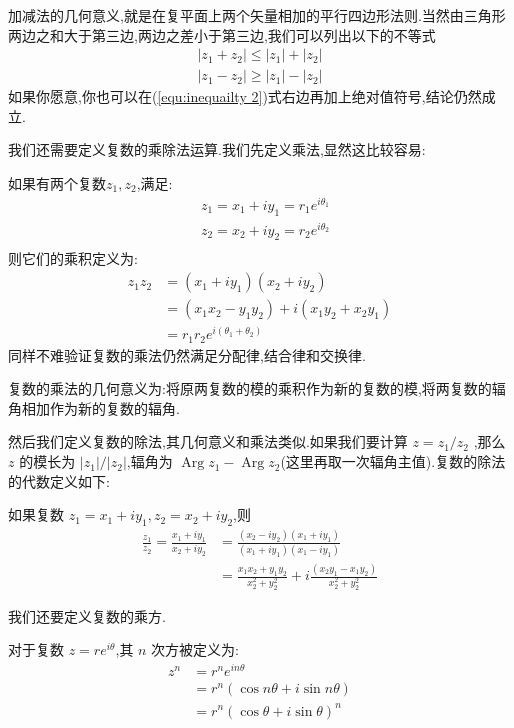\documentclass[UTF8]{ctexbook}
\begin{document}
加减法的几何意义,就是在复平面上两个矢量相加的平行四边形法则.当然由三角形两边之和大于第三边,两边之差小于第三边,我们可以列出以下的不等式
\begin{align}
    |z_1+z_2| \leqslant |z_1| + |z_2| \label{equ:inequality 1}\\
    |z_1-z_2| \geqslant |z_1| - |z_2| \label{equ:inequailty 2}
\end{align}
如果你愿意,你也可以在(\ref{equ:inequailty 2})式右边再加上绝对值符号,结论仍然成立.

我们还需要定义复数的乘除法运算.我们先定义乘法,显然这比较容易:
\begin{definition}
    如果有两个复数$z_1,z_2$,满足:
    \begin{align*}
        &z_1 = x_1 + iy_1 = r_1e^{i\theta_1} \\
        &z_2 = x_2 + iy_2 = r_2e^{i\theta_2} \\
    \end{align*}
    则它们的乘积定义为:
    \begin{align}
        z_1z_2 &= (x_1+iy_1)(x_2+iy_2) \nonumber \\
        &= (x_1x_2-y_1y_2) + i(x_1y_2+x_2y_1) \label{equ:def of product 1}\\
        &= r_1r_2e^{i(\theta_1+\theta_2)} \label{equ:def of product 2}
    \end{align}
    同样不难验证复数的乘法仍然满足分配律,结合律和交换律.
\end{definition}

复数的乘法的几何意义为:将原两复数的模的乘积作为新的复数的模,将两复数的辐角相加作为新的复数的辐角.

然后我们定义复数的除法,其几何意义和乘法类似.如果我们要计算 $z=z_1/z_2$ ,那么 $z$ 的模长为 $|z_1|/|z_2|$,辐角为 $\operatorname{Arg}z_1-\operatorname{Arg}z_2$(这里再取一次辐角主值).复数的除法的代数定义如下:

\begin{definition}
    如果复数 $z_1=x_1+iy_1,z_2=x_2+iy_2$,则
    \begin{align}
        \frac{z_1}{z_2} = \frac{x_1+iy_1}{x_2+iy_2} &= \frac{(x_2-iy_2)(x_1+iy_1)}{(x_1+iy_1)(x_1-iy_1)} \nonumber \\
        &= \frac{x_1x_2+y_1y_2}{x_2^2+y_2^2} + i\frac{(x_2y_1-x_1y_2)}{x_2^2+y_2^2}
        \label{equ:def of division}
    \end{align}
\end{definition}

我们还要定义复数的乘方.

\begin{definition}
    对于复数 $z=re^{i\theta}$,其 $n$ 次方被定义为:
    \begin{align}
        z^n &= r^ne^{in\theta} \label{equ:def of pow 1} \\
        &= r^n(\cos n\theta + i\sin n\theta) \label{equ:def of pow 2}\\
        &= r^n(\cos\theta +i\sin\theta)^n \label{equ:def of pow 3}
    \end{align}
\end{definition}
\end{document}
